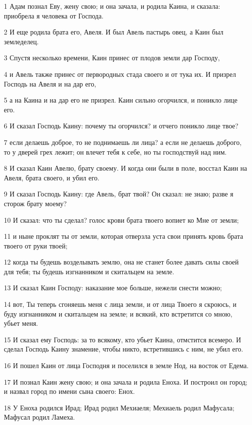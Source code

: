 \par 1 Адам познал Еву, жену свою; и она зачала, и родила Каина, и сказала: приобрела я человека от Господа.
\par 2 И еще родила брата его, Авеля. И был Авель пастырь овец, а Каин был земледелец.
\par 3 Спустя несколько времени, Каин принес от плодов земли дар Господу,
\par 4 и Авель также принес от первородных стада своего и от тука их. И призрел Господь на Авеля и на дар его,
\par 5 а на Каина и на дар его не призрел. Каин сильно огорчился, и поникло лице его.
\par 6 И сказал Господь Каину: почему ты огорчился? и отчего поникло лице твое?
\par 7 если делаешь доброе, то не поднимаешь ли лица? а если не делаешь доброго, то у дверей грех лежит; он влечет тебя к себе, но ты господствуй над ним.
\par 8 И сказал Каин Авелю, брату своему. И когда они были в поле, восстал Каин на Авеля, брата своего, и убил его.
\par 9 И сказал Господь Каину: где Авель, брат твой? Он сказал: не знаю; разве я сторож брату моему?
\par 10 И сказал: что ты сделал? голос крови брата твоего вопиет ко Мне от земли;
\par 11 и ныне проклят ты от земли, которая отверзла уста свои принять кровь брата твоего от руки твоей;
\par 12 когда ты будешь возделывать землю, она не станет более давать силы своей для тебя; ты будешь изгнанником и скитальцем на земле.
\par 13 И сказал Каин Господу: наказание мое больше, нежели снести можно;
\par 14 вот, Ты теперь сгоняешь меня с лица земли, и от лица Твоего я скроюсь, и буду изгнанником и скитальцем на земле; и всякий, кто встретится со мною, убьет меня.
\par 15 И сказал ему Господь: за то всякому, кто убьет Каина, отмстится всемеро. И сделал Господь Каину знамение, чтобы никто, встретившись с ним, не убил его.
\par 16 И пошел Каин от лица Господня и поселился в земле Нод, на восток от Едема.
\par 17 И познал Каин жену свою; и она зачала и родила Еноха. И построил он город; и назвал город по имени сына своего: Енох.
\par 18 У Еноха родился Ирад; Ирад родил Мехиаеля; Мехиаель родил Мафусала; Мафусал родил Ламеха.
